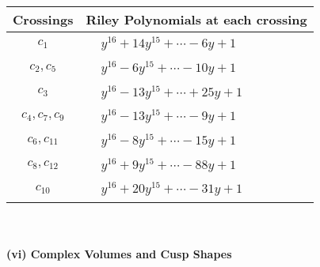 \documentclass[1p]{elsarticle_modified}
\theoremstyle{definition}
\begin{document}
\begin{tabular}{m{50pt}|m{274pt}}
Crossings & \hspace{64pt}Riley Polynomials at each crossing \\
\hline $$\begin{aligned}c_{1}\end{aligned}$$&$\begin{aligned}
&y^{16}+14 y^{15}+\cdots-6 y+1
\end{aligned}$\\
\hline $$\begin{aligned}c_{2},c_{5}\end{aligned}$$&$\begin{aligned}
&y^{16}-6 y^{15}+\cdots-10 y+1
\end{aligned}$\\
\hline $$\begin{aligned}c_{3}\end{aligned}$$&$\begin{aligned}
&y^{16}-13 y^{15}+\cdots+25 y+1
\end{aligned}$\\
\hline $$\begin{aligned}c_{4},c_{7},c_{9}\end{aligned}$$&$\begin{aligned}
&y^{16}-13 y^{15}+\cdots-9 y+1
\end{aligned}$\\
\hline $$\begin{aligned}c_{6},c_{11}\end{aligned}$$&$\begin{aligned}
&y^{16}-8 y^{15}+\cdots-15 y+1
\end{aligned}$\\
\hline $$\begin{aligned}c_{8},c_{12}\end{aligned}$$&$\begin{aligned}
&y^{16}+9 y^{15}+\cdots-88 y+1
\end{aligned}$\\
\hline $$\begin{aligned}c_{10}\end{aligned}$$&$\begin{aligned}
&y^{16}+20 y^{15}+\cdots-31 y+1
\end{aligned}$\\
\hline
\end{tabular}\\~\\
\newpage\flushleft \textbf{(vi) Complex Volumes and Cusp Shapes}
\end{document}
